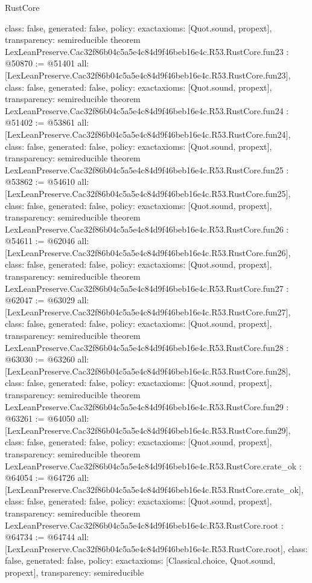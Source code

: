 \begin{lexlean}{RustCore}
\begin{coremodule}
{  class: false,
  generated: false,
  policy: exact{axioms: [Quot.sound, propext]},
  transparency: semireducible
}
theorem LexLeanPreserve.Cac32f86b04c5a5e4c84d9f46beb16e4c.R53.RustCore.fun23 : @50870 := @51401 {
  all: [LexLeanPreserve.Cac32f86b04c5a5e4c84d9f46beb16e4c.R53.RustCore.fun23],
  class: false,
  generated: false,
  policy: exact{axioms: [Quot.sound, propext]},
  transparency: semireducible
}
theorem LexLeanPreserve.Cac32f86b04c5a5e4c84d9f46beb16e4c.R53.RustCore.fun24 : @51402 := @53861 {
  all: [LexLeanPreserve.Cac32f86b04c5a5e4c84d9f46beb16e4c.R53.RustCore.fun24],
  class: false,
  generated: false,
  policy: exact{axioms: [Quot.sound, propext]},
  transparency: semireducible
}
theorem LexLeanPreserve.Cac32f86b04c5a5e4c84d9f46beb16e4c.R53.RustCore.fun25 : @53862 := @54610 {
  all: [LexLeanPreserve.Cac32f86b04c5a5e4c84d9f46beb16e4c.R53.RustCore.fun25],
  class: false,
  generated: false,
  policy: exact{axioms: [Quot.sound, propext]},
  transparency: semireducible
}
theorem LexLeanPreserve.Cac32f86b04c5a5e4c84d9f46beb16e4c.R53.RustCore.fun26 : @54611 := @62046 {
  all: [LexLeanPreserve.Cac32f86b04c5a5e4c84d9f46beb16e4c.R53.RustCore.fun26],
  class: false,
  generated: false,
  policy: exact{axioms: [Quot.sound, propext]},
  transparency: semireducible
}
theorem LexLeanPreserve.Cac32f86b04c5a5e4c84d9f46beb16e4c.R53.RustCore.fun27 : @62047 := @63029 {
  all: [LexLeanPreserve.Cac32f86b04c5a5e4c84d9f46beb16e4c.R53.RustCore.fun27],
  class: false,
  generated: false,
  policy: exact{axioms: [Quot.sound, propext]},
  transparency: semireducible
}
theorem LexLeanPreserve.Cac32f86b04c5a5e4c84d9f46beb16e4c.R53.RustCore.fun28 : @63030 := @63260 {
  all: [LexLeanPreserve.Cac32f86b04c5a5e4c84d9f46beb16e4c.R53.RustCore.fun28],
  class: false,
  generated: false,
  policy: exact{axioms: [Quot.sound, propext]},
  transparency: semireducible
}
theorem LexLeanPreserve.Cac32f86b04c5a5e4c84d9f46beb16e4c.R53.RustCore.fun29 : @63261 := @64050 {
  all: [LexLeanPreserve.Cac32f86b04c5a5e4c84d9f46beb16e4c.R53.RustCore.fun29],
  class: false,
  generated: false,
  policy: exact{axioms: [Quot.sound, propext]},
  transparency: semireducible
}
theorem LexLeanPreserve.Cac32f86b04c5a5e4c84d9f46beb16e4c.R53.RustCore.crate_ok : @64054 := @64726 {
  all: [LexLeanPreserve.Cac32f86b04c5a5e4c84d9f46beb16e4c.R53.RustCore.crate_ok],
  class: false,
  generated: false,
  policy: exact{axioms: [Quot.sound, propext]},
  transparency: semireducible
}
theorem LexLeanPreserve.Cac32f86b04c5a5e4c84d9f46beb16e4c.R53.RustCore.root : @64734 := @64744 {
  all: [LexLeanPreserve.Cac32f86b04c5a5e4c84d9f46beb16e4c.R53.RustCore.root],
  class: false,
  generated: false,
  policy: exact{axioms: [Classical.choice, Quot.sound, propext]},
  transparency: semireducible
}


\end{coremodule}
\end{lexlean}
